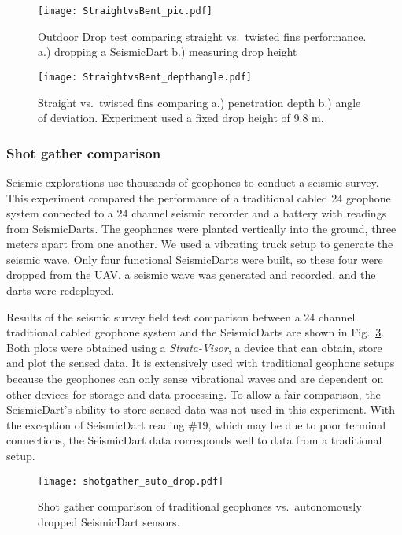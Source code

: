 \begin{figure} \centering
  {\texttt{[image: StraightvsBent\_pic.pdf]}}
 \caption{Outdoor Drop test comparing straight vs.\ twisted fins performance.
 a.)  dropping a SeismicDart  
 b.)  measuring drop height} 
 \label{fig:StraightBentPic}
 \vspace{-1em}
\end{figure}
\begin{figure} \centering
  {\texttt{[image: StraightvsBent\_depthangle.pdf]}}
 \caption{\label{fig:StraightBentDepth}Straight vs.\ twisted fins comparing a.) penetration depth b.) angle of deviation. Experiment used a fixed drop height of 9.8 m.} 
\end{figure}
\subsubsection{Shot gather comparison}
Seismic explorations use thousands of geophones to conduct a seismic survey. 
This experiment compared the performance of a traditional cabled $24$ geophone system connected to a $24$ channel seismic recorder and a battery with readings from SeismicDarts.
The geophones were planted vertically into the ground, three meters apart from one another.  
We used a vibrating truck setup to generate the seismic wave. 
Only four functional SeismicDarts were built, so these four were dropped from the UAV, a seismic wave was generated and recorded, and the darts were redeployed.

Results of the seismic survey field test comparison between a $24$ channel traditional cabled geophone system and the SeismicDarts are shown in Fig.~\ref{fig:shotgather_auto_drop}.  
Both plots were obtained using a \emph{Strata-Visor}, a device that can obtain, store and plot the sensed data. 
It is extensively used with traditional geophone setups because the geophones can only sense vibrational waves and are dependent on other devices for storage and data processing. 
To allow a fair comparison, the SeismicDart's  ability to store sensed data was not used in this experiment. 
With the exception of SeismicDart reading \#19, which may be due to poor terminal connections, the SeismicDart data corresponds well to data from a traditional setup.


\begin{figure} \centering
  {\texttt{[image: shotgather\_auto\_drop.pdf]}}
 \caption{Shot gather comparison of traditional geophones vs.\ autonomously dropped SeismicDart sensors. 
 \label{fig:shotgather_auto_drop}}
\end{figure}


 